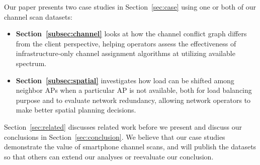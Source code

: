 Our paper presents two case studies in Section~\ref{sec:case} using one or
both of our channel scan datasets:

\begin{itemize}
  \item \textbf{Section~\ref{subsec:channel}} looks at how the channel conflict
    graph differs from the client perspective, helping operators assess the
    effectiveness of infrastructure-only channel assignment algorithms at
    utilizing available spectrum.

  \item \textbf{Section~\ref{subsec:spatial}} investigates how load can be
    shifted among neighbor APs when a particular AP is not available, both for
    load balancing purpose and to evaluate network redundancy, allowing network
    operators to make better spatial planning decisions.
\end{itemize}

Section~\ref{sec:related} discusses related work before we present and
discuss our conclusions in Section~\ref{sec:conclusion}. We believe that our
case studies demonstrate the value of smartphone channel scans, and will
publish the datasets so that others can extend our analyses or reevaluate
our conclusion.
